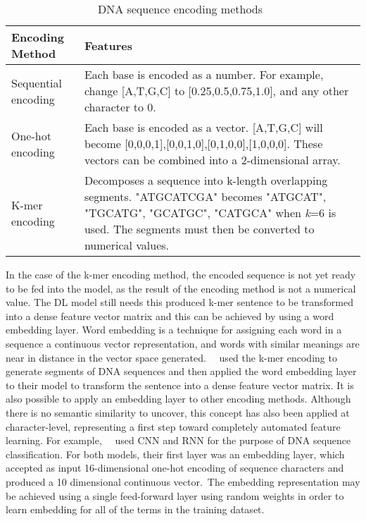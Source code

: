 \begin{table}[ht]
	\caption{DNA sequence encoding methods~\cite{Yang2020ReviewDNA}}
	\label{tab:encoding_methods}
\centering
\begin{tabular}{lp{8cm}}
	\toprule
	\textbf{Encoding Method} & \textbf{Features} \\
	\midrule
	
	Sequential encoding & Each base is encoded as a number. For example, change [A,T,G,C] to [0.25,0.5,0.75,1.0], and any other character to 0.\\\midrule
	
    One-hot encoding & Each base is encoded as a vector. [A,T,G,C] will become [0,0,0,1],[0,0,1,0],[0,1,0,0],[1,0,0,0]. These vectors can be combined into a 2-dimensional array.\\\midrule
    
    K-mer encoding & Decomposes a sequence into k-length overlapping segments. "ATGCATCGA" becomes "ATGCAT", "TGCATG", "GCATGC", "CATGCA"  when \textit{k}=6 is used. The segments must then be converted to numerical values.\\
    
	\bottomrule
\end{tabular}
\end{table}

In the case of the k-mer encoding method, the encoded sequence is not yet ready to be fed into the model, as the result of the encoding method is not a numerical value. The \gls{DL} model still needs this produced k-mer sentence to be transformed into a dense feature vector matrix and this can be achieved by using a word embedding layer. Word embedding is a technique for assigning each word in a sequence a continuous vector representation, and words with similar meanings are near in distance in the vector space generated.~\citeauthor{Gunasekaran2021AnalysisModels}~\cite{Gunasekaran2021AnalysisModels} used the k-mer encoding to generate segments of \gls{DNA} sequences and then applied the word embedding layer to their model to transform the sentence into a dense feature vector matrix. It is also possible to apply an embedding layer to other encoding methods. Although there is no semantic similarity to uncover, this concept has also been applied at character-level, representing a first step toward completely automated feature learning. For example,~\citeauthor{LoBosco2017DeepClassification}~\cite{LoBosco2017DeepClassification} used \gls{CNN} and \gls{RNN} for the purpose of \gls{DNA} sequence classification. For both models, their first layer was an embedding layer, which accepted as input 16-dimensional one-hot encoding of sequence characters and produced a 10 dimensional continuous vector. The embedding representation may be achieved using a single feed-forward layer using random weights in order to learn embedding for all of the terms in the training dataset.

